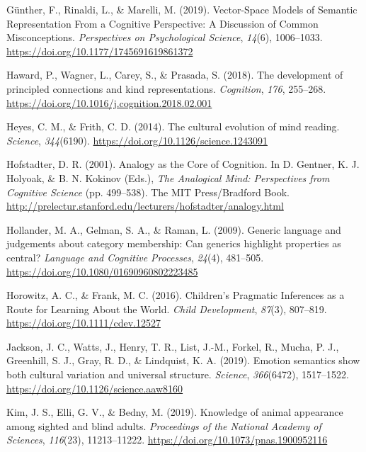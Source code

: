\documentclass[11pt,man]{article}
\newlength{\cslhangindent}
\newenvironment{cslreferences}%
  {\setlength{\parindent}{0pt}%
  \everypar{\setlength{\hangindent}{\cslhangindent}}\ignorespaces}%
  {\par}
\begin{document}
\begin{cslreferences}
\leavevmode\hypertarget{ref-gunther_vector-space_2019}{}%
Günther, F., Rinaldi, L., \& Marelli, M. (2019). Vector-Space Models of
Semantic Representation From a Cognitive Perspective: A Discussion of
Common Misconceptions. \emph{Perspectives on Psychological Science},
\emph{14}(6), 1006--1033. \url{https://doi.org/10.1177/1745691619861372}

\leavevmode\hypertarget{ref-haward_development_2018}{}%
Haward, P., Wagner, L., Carey, S., \& Prasada, S. (2018). The
development of principled connections and kind representations.
\emph{Cognition}, \emph{176}, 255--268.
\url{https://doi.org/10.1016/j.cognition.2018.02.001}

\leavevmode\hypertarget{ref-heyes_cultural_2014}{}%
Heyes, C. M., \& Frith, C. D. (2014). The cultural evolution of mind
reading. \emph{Science}, \emph{344}(6190).
\url{https://doi.org/10.1126/science.1243091}

\leavevmode\hypertarget{ref-hofstadter_analogy_2001}{}%
Hofstadter, D. R. (2001). Analogy as the Core of Cognition. In D.
Gentner, K. J. Holyoak, \& B. N. Kokinov (Eds.), \emph{The Analogical
Mind: Perspectives from Cognitive Science} (pp. 499--538). The MIT
Press/Bradford Book.
\url{http://prelectur.stanford.edu/lecturers/hofstadter/analogy.html}

\leavevmode\hypertarget{ref-hollander_generic_2009}{}%
Hollander, M. A., Gelman, S. A., \& Raman, L. (2009). Generic language
and judgements about category membership: Can generics highlight
properties as central? \emph{Language and Cognitive Processes},
\emph{24}(4), 481--505. \url{https://doi.org/10.1080/01690960802223485}

\leavevmode\hypertarget{ref-horowitz_childrens_2016}{}%
Horowitz, A. C., \& Frank, M. C. (2016). Children's Pragmatic Inferences
as a Route for Learning About the World. \emph{Child Development},
\emph{87}(3), 807--819. \url{https://doi.org/10.1111/cdev.12527}

\leavevmode\hypertarget{ref-jackson_emotion_2019}{}%
Jackson, J. C., Watts, J., Henry, T. R., List, J.-M., Forkel, R., Mucha,
P. J., Greenhill, S. J., Gray, R. D., \& Lindquist, K. A. (2019).
Emotion semantics show both cultural variation and universal structure.
\emph{Science}, \emph{366}(6472), 1517--1522.
\url{https://doi.org/10.1126/science.aaw8160}

\leavevmode\hypertarget{ref-kim_knowledge_2019}{}%
Kim, J. S., Elli, G. V., \& Bedny, M. (2019). Knowledge of animal
appearance among sighted and blind adults. \emph{Proceedings of the
National Academy of Sciences}, \emph{116}(23), 11213--11222.
\url{https://doi.org/10.1073/pnas.1900952116}


\end{cslreferences}
\end{document}
